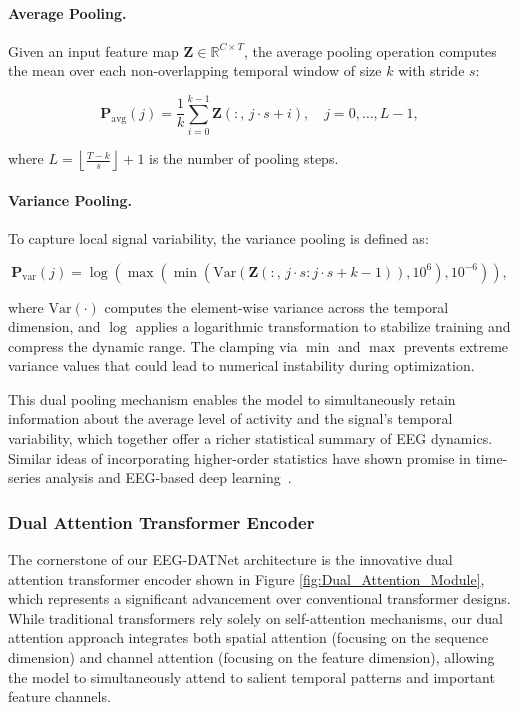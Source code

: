 \documentclass[pdflatex,sn-mathphys-num]{sn-jnl}%
\theoremstyle{thmstyleone}%
\theoremstyle{thmstyletwo}%
\theoremstyle{thmstylethree}%
\begin{document}
\paragraph{Average Pooling.} Given an input feature map \(\mathbf{Z} \in \mathbb{R}^{C \times T}\), the average pooling operation computes the mean over each non-overlapping temporal window of size \(k\) with stride \(s\):

\begin{equation}
\mathbf{P}_{\text{avg}}(j) = \frac{1}{k} \sum_{i=0}^{k-1} \mathbf{Z}(:,\, j \cdot s + i), \quad j = 0, \dots, L-1,
\end{equation}

where \(L = \left\lfloor \frac{T - k}{s} \right\rfloor + 1\) is the number of pooling steps.

\paragraph{Variance Pooling.} To capture local signal variability, the variance pooling is defined as:

\begin{equation}
\mathbf{P}_{\text{var}}(j) = \log \left( \max \left( \min \left( \text{Var} \left( \mathbf{Z}(:,\, j \cdot s : j \cdot s + k - 1) \right), 10^6 \right), 10^{-6} \right) \right),
\label{eq:varpool}
\end{equation}

where \(\text{Var}(\cdot)\) computes the element-wise variance across the temporal dimension, and \(\log\) applies a logarithmic transformation to stabilize training and compress the dynamic range. The clamping via \(\min\) and \(\max\) prevents extreme variance values that could lead to numerical instability during optimization.

This dual pooling mechanism enables the model to simultaneously retain information about the average level of activity and the signal's temporal variability, which together offer a richer statistical summary of EEG dynamics. Similar ideas of incorporating higher-order statistics have shown promise in time-series analysis and EEG-based deep learning~\cite{lotte2018review, lawhern2018eegnet}.

\subsubsection{Dual Attention Transformer Encoder}
The cornerstone of our EEG-DATNet architecture is the innovative dual attention transformer encoder shown in Figure \ref{fig:Dual_Attention_Module}, which represents a significant advancement over conventional transformer designs. While traditional transformers rely solely on self-attention mechanisms, our dual attention approach integrates both spatial attention (focusing on the sequence dimension) and channel attention (focusing on the feature dimension), allowing the model to simultaneously attend to salient temporal patterns and important feature channels.
\end{document}
